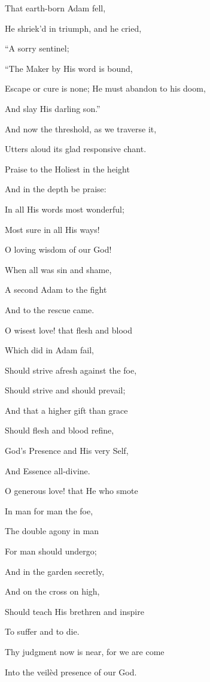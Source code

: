 That earth-born Adam fell,

He
shriek'd in triumph, and he cried,

``A sorry sentinel;

``The
Maker by His word is bound,

Escape or cure is none; He must
abandon to his doom,

And slay His darling son.''


And now the threshold, as we traverse it,

Utters aloud its glad responsive chant.


Praise to
the Holiest in the height

And in the depth be praise:

In all
His words most wonderful;

Most sure in all His ways!

O loving
wisdom of our God!

When all was sin and shame,

A
second Adam to the fight

And to the rescue came.

O wisest
love! that flesh and blood

Which did in Adam fail,

Should
strive afresh against the foe,

Should strive and should prevail; 

And that
a higher gift than grace

Should flesh and blood refine,

God's
Presence and His very Self,

And Essence all-divine.

O
generous love! that He who smote

In man for man the foe,

The
double agony in man

For man should undergo;

And in
the garden secretly,

And on the cross on high,

Should
teach His brethren and inspire

To suffer and to die.


Thy judgment now is near, for we are come

Into the veilèd presence of our God.

